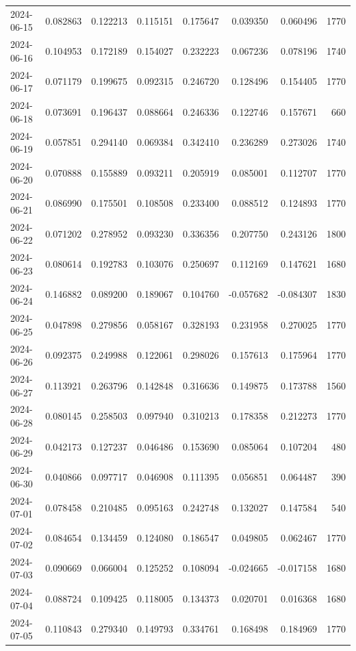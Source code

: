 \begin{tabular}{lrrrrrrr}
2024-06-15 & 0.082863 & 0.122213 & 0.115151 & 0.175647 & 0.039350 & 0.060496 & 1770 \\
2024-06-16 & 0.104953 & 0.172189 & 0.154027 & 0.232223 & 0.067236 & 0.078196 & 1740 \\
2024-06-17 & 0.071179 & 0.199675 & 0.092315 & 0.246720 & 0.128496 & 0.154405 & 1770 \\
2024-06-18 & 0.073691 & 0.196437 & 0.088664 & 0.246336 & 0.122746 & 0.157671 & 660 \\
2024-06-19 & 0.057851 & 0.294140 & 0.069384 & 0.342410 & 0.236289 & 0.273026 & 1740 \\
2024-06-20 & 0.070888 & 0.155889 & 0.093211 & 0.205919 & 0.085001 & 0.112707 & 1770 \\
2024-06-21 & 0.086990 & 0.175501 & 0.108508 & 0.233400 & 0.088512 & 0.124893 & 1770 \\
2024-06-22 & 0.071202 & 0.278952 & 0.093230 & 0.336356 & 0.207750 & 0.243126 & 1800 \\
2024-06-23 & 0.080614 & 0.192783 & 0.103076 & 0.250697 & 0.112169 & 0.147621 & 1680 \\
2024-06-24 & 0.146882 & 0.089200 & 0.189067 & 0.104760 & -0.057682 & -0.084307 & 1830 \\
2024-06-25 & 0.047898 & 0.279856 & 0.058167 & 0.328193 & 0.231958 & 0.270025 & 1770 \\
2024-06-26 & 0.092375 & 0.249988 & 0.122061 & 0.298026 & 0.157613 & 0.175964 & 1770 \\
2024-06-27 & 0.113921 & 0.263796 & 0.142848 & 0.316636 & 0.149875 & 0.173788 & 1560 \\
2024-06-28 & 0.080145 & 0.258503 & 0.097940 & 0.310213 & 0.178358 & 0.212273 & 1770 \\
2024-06-29 & 0.042173 & 0.127237 & 0.046486 & 0.153690 & 0.085064 & 0.107204 & 480 \\
2024-06-30 & 0.040866 & 0.097717 & 0.046908 & 0.111395 & 0.056851 & 0.064487 & 390 \\
2024-07-01 & 0.078458 & 0.210485 & 0.095163 & 0.242748 & 0.132027 & 0.147584 & 540 \\
2024-07-02 & 0.084654 & 0.134459 & 0.124080 & 0.186547 & 0.049805 & 0.062467 & 1770 \\
2024-07-03 & 0.090669 & 0.066004 & 0.125252 & 0.108094 & -0.024665 & -0.017158 & 1680 \\
2024-07-04 & 0.088724 & 0.109425 & 0.118005 & 0.134373 & 0.020701 & 0.016368 & 1680 \\
2024-07-05 & 0.110843 & 0.279340 & 0.149793 & 0.334761 & 0.168498 & 0.184969 & 1770 \\

\end{tabular}
